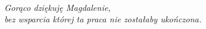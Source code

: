 \documentclass[
  a4paper,
  justified,
  nobib,
  marginals=raggedright,
]{tufte-book}
\begin{document}
\frontmatter
\maketitle

\cleardoublepage
\thispagestyle{empty}
~\vfill
\vfill
\begin{fullwidth}
\begin{doublespace}
\raggedleft\noindent\fontsize{16}{20}\selectfont\itshape
\nohyphenation
Gorąco dziękuję Magdalenie,\\
bez wsparcia której ta praca nie zostałaby ukończona.
\end{doublespace}
\end{fullwidth}
\vfill

\tableofcontents



\mainmatter







\backmatter

\end{document}
